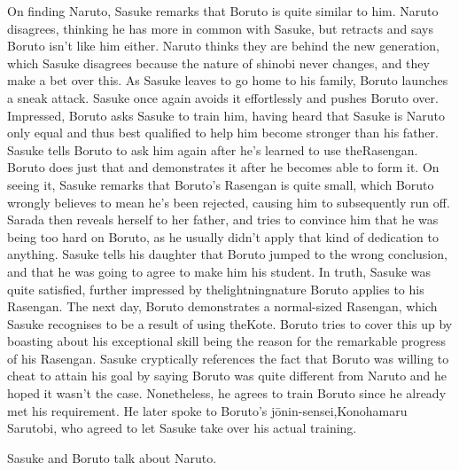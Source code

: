 \documentclass[a4paper,12pt]{article}
\begin{document}
On finding Naruto, Sasuke remarks that Boruto is quite similar to him. Naruto disagrees, thinking he has more in common with Sasuke, but retracts and says Boruto isn't like him either. Naruto thinks they are behind the new generation, which Sasuke disagrees because the nature of shinobi never changes, and they make a bet over this. As Sasuke leaves to go home to his family, Boruto launches a sneak attack. Sasuke once again avoids it effortlessly and pushes Boruto over. Impressed, Boruto asks Sasuke to train him, having heard that Sasuke is Naruto only equal and thus best qualified to help him become stronger than his father. Sasuke tells Boruto to ask him again after he's learned to use theRasengan. Boruto does just that and demonstrates it after he becomes able to form it. On seeing it, Sasuke remarks that Boruto's Rasengan is quite small, which Boruto wrongly believes to mean he's been rejected, causing him to subsequently run off. Sarada then reveals herself to her father, and tries to convince him that he was being too hard on Boruto, as he usually didn't apply that kind of dedication to anything. Sasuke tells his daughter that Boruto jumped to the wrong conclusion, and that he was going to agree to make him his student. In truth, Sasuke was quite satisfied, further impressed by thelightningnature Boruto applies to his Rasengan. The next day, Boruto demonstrates a normal-sized Rasengan, which Sasuke recognises to be a result of using theKote. Boruto tries to cover this up by boasting about his exceptional skill being the reason for the remarkable progress of his Rasengan. Sasuke cryptically references the fact that Boruto was willing to cheat to attain his goal by saying Boruto was quite different from Naruto and he hoped it wasn't the case. Nonetheless, he agrees to train Boruto since he already met his requirement. He later spoke to Boruto's jōnin-sensei,Konohamaru Sarutobi, who agreed to let Sasuke take over his actual training.\\ \par \vspace{0.5cm}

Sasuke and Boruto talk about Naruto.\\ \par \vspace{0.5cm}
\end{document}
